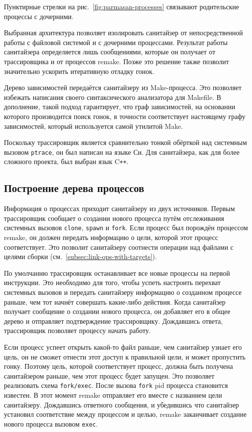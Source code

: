 Пунктирные стрелки на рис.~\ref{fig:parmasan-processes} связывают родительские процессы с дочерними.

Выбранная архитектура позволяет изолировать санитайзер от непосредственной работы с файловой системой и с дочерними процессами. Результат работы санитайзера определяется лишь сообщениями, которые он получает от трассировщика и от процессов remake. Позже это решение также позволит значительно ускорить итеративную отладку гонок.

Дерево зависимостей передаётся санитайзеру из Make-процесса. Это позволяет избежать написания своего синтаксического анализатора для Makefile. В дополнение, такой подход гарантирует, что граф зависимостей, на основании которого производится поиск гонок, в точности соответствует настоящему графу зависимостей, который используется самой утилитой Make.

Поскольку трассировщик является сравнительно тонкой обёрткой над системным вызовом \texttt{ptrace}, он был написан на языке Си. Для санитайзера, как для более сложного проекта, был выбран язык C\texttt{++}.

\subsection{Построение дерева процессов}

Информация о процессах приходит санитайзеру из двух источников. Первым трассировщик сообщает о создании нового процесса путём отслеживания системных вызовов \texttt{clone}, \texttt{spawn} и \texttt{fork}. Если процесс был порождён процессом remake, он должен передать информацию о цели, которой этот процесс соответствует. Это позволит санитайзеру соотнести операции над файлами с целями сборки (см.~\ref{subsec:link-ops-with-targets}).

По умолчанию трассировщик останавливает все новые процессы на первой инструкции. Это необходимо для того, чтобы успеть настроить перехват системных вызовов и передать санитайзеру информацию о созданном процессе раньше, чем тот начнёт совершать какие-либо действия. Когда санитайзер получает сообщение о создании нового процесса, он добавляет его в общее дерево и отправляет подтверждение трассировщику. Дождавшись ответа, трассировщик позволяет процессу начать работу.

Если процесс успеет открыть какой-то файл раньше, чем санитайзер узнает его цель, он не сможет отнести этот доступ к правильной цели, и может пропустить гонку. Поэтому цель, которой соответствует процесс, должна быть получена санитайзером раньше, чем этот процесс будет запущен. Это позволяет реализовать схема \texttt{fork/exec}. После вызова \texttt{fork} pid процесса становится известен. В этот момент remake отправляет его вместе с названием цели санитайзеру. Дождавшись ответного сообщения, и убедившись что санитайзер установил соответствие между процессом и целью, remake заканчивает создание нового процесса вызовом \texttt{exec}.

